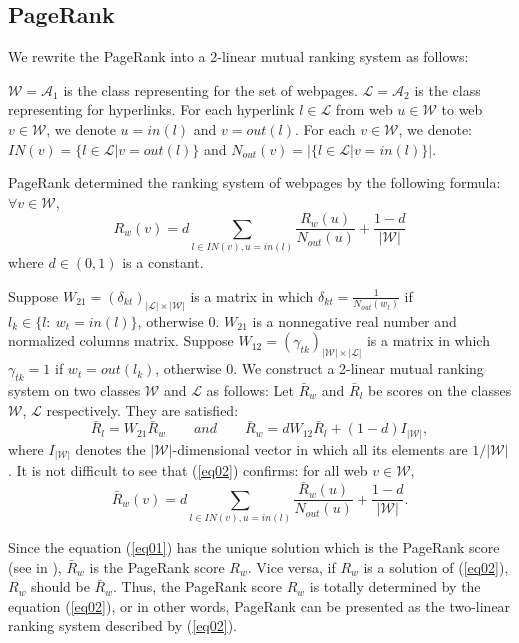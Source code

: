 \documentclass[10pt,leqno,twoside]{article}
\begin{document}
\subsection{PageRank}\label{Sect:PageRank}
We rewrite the PageRank into a 2-linear mutual ranking system as follows:

$\mathcal{W}= \mathcal{A}_1$ is the class representing for the set of webpages. $\mathcal{L}= \mathcal{A}_2$ is the class representing for hyperlinks. For each hyperlink $l\in \mathcal{L}$ from web $u\in \mathcal{W}$ to web $v \in \mathcal{W}$, we denote $u=in(l)$ and $v=out(l)$. For each $v \in \mathcal{W}$, we denote: $IN(v)=\{l \in \mathcal{L}|  v=out(l)\}$ and $N_{out}(v)=|\{ l\in \mathcal{L}| v=in(l)\}|$.
\setlength{\parskip}{3pt}

PageRank\cite{pagerank98} determined the ranking system of webpages by the following formula: $\forall v\in\mathcal{W}$,
\begin{equation}\label{eq01}
R_w(v) = d\sum_{l \in IN(v), u=in(l)} \frac{R_w(u)}{N_{out}(u)} + \frac{1-d}{|\mathcal{W}|}
\end{equation}
where $d\in (0,1)$ is a constant.
\setlength{\parskip}{3pt}

Suppose  $W_{21} = (\delta_{kt}) _{|\mathcal{L}|\times |\mathcal{W}|}$ is a matrix in which $\delta_{kt} = \frac{1}{N_{out}(w_t)}$ if $l_k\in \{l:~w_t = in(l)\}$, otherwise 0. $W_{21}$ is a nonnegative real number and normalized columns matrix. Suppose  $W_{12} = (\gamma_{tk}) _{|\mathcal{W}|\times |\mathcal{L}|}$ is a matrix in which $\gamma_{tk} = 1$ if $w_t= out (l_k)$, otherwise 0. We construct a 2-linear mutual ranking system on two classes $\mathcal{W}$ and $\mathcal{L}$ as follows: Let $\bar{R}_w$ and $\bar{R}_l$ be scores on the classes $\mathcal{W}$, $\mathcal{L}$ respectively. They are satisfied:
\begin{equation}\label{eq02}
\bar{R}_l = W_{21}\bar{R}_w\qquad and \qquad
\bar{R}_w = dW_{12}\bar{R}_l + (1-d)I_{|\mathcal{W}|},
\end{equation}
where $I_{|\mathcal{W}|}$ denotes the $|\mathcal{W}|$-dimensional vector in which all its elements are $1/|\mathcal{W}|$. It is not difficult to see that (\ref{eq02}) confirms: for all web $v\in\mathcal{W}$,
\[\bar{R}_w(v) = d\sum_{l \in IN(v), u=in(l)} \frac{\bar{R}_w(u)}{N_{out}(u)} + \frac{1-d}{|\mathcal{W}|}.\]

Since the equation (\ref{eq01}) has the unique solution which is the PageRank score (see in \cite{pagerank98}), $\bar{R}_w$ is the PageRank score $R_w$. Vice versa, if $R_w$ is a solution of (\ref{eq02}), $R_w$ should be $\bar{R}_w$. Thus, the PageRank score $R_w$ is totally determined by the equation (\ref{eq02}), or in other words, PageRank can be presented as the two-linear ranking system described by (\ref{eq02}).
\setlength{\parskip}{3pt}
\end{document}
